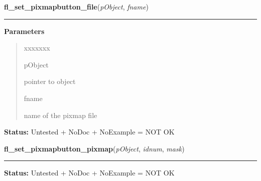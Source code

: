     \label{xformslib:library:fl_set_pixmap_file}

    \vspace{0.5ex}

\hspace{.8\funcindent}\begin{boxedminipage}{\funcwidth}

    \raggedright \textbf{fl\_set\_pixmapbutton\_file}(\textit{pObject}, \textit{fname})

    \vspace{-1.5ex}

    \rule{\textwidth}{0.5\fboxrule}
\setlength{\parskip}{2ex}
\setlength{\parskip}{1ex}
      \textbf{Parameters}
      \vspace{-1ex}

      \begin{quote}
        \begin{Ventry}{xxxxxxx}

          \item[pObject]

          pointer to object

          \item[fname]

          name of the pixmap file

        \end{Ventry}

      \end{quote}

\textbf{Status:} Untested + NoDoc + NoExample = NOT OK



    \end{boxedminipage}

    \label{xformslib:library:fl_set_pixmap_pixmap}

    \vspace{0.5ex}

\hspace{.8\funcindent}\begin{boxedminipage}{\funcwidth}

    \raggedright \textbf{fl\_set\_pixmapbutton\_pixmap}(\textit{pObject}, \textit{idnum}, \textit{mask})

    \vspace{-1.5ex}

    \rule{\textwidth}{0.5\fboxrule}
\setlength{\parskip}{2ex}
\setlength{\parskip}{1ex}
\textbf{Status:} Untested + NoDoc + NoExample = NOT OK



    \end{boxedminipage}

